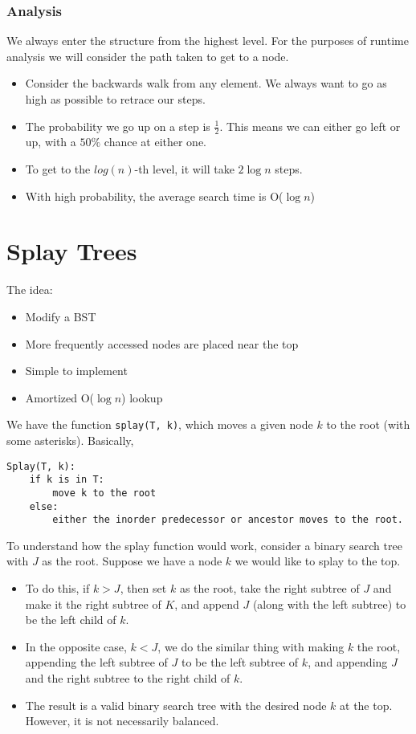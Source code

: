 \documentclass[10pt]{article}
\begin{document}
\subsubsection*{Analysis}
We always enter the structure from the highest level.  For the purposes of runtime analysis we will consider the path taken to get to a node.
\begin{itemize}
	\item Consider the backwards walk from any element.  We always want to go as high as possible to retrace our steps.
	\item The probability we go up on a step is $\frac{1}{2}$.  This means we can either go left or up, with a $50\%$ chance at either one.
	\item To get to the $log(n)$-th level, it will take $2\log n$ steps.
	\item With high probability, the average search time is O($\log n$)
\end{itemize}

\section*{Splay Trees}
The idea:
\begin{itemize}
	\item Modify a BST
	\item More frequently accessed nodes are placed near the top
	\item Simple to implement
	\item Amortized O($\log n$) lookup
\end{itemize}
We have the function \texttt{splay(T, k)}, which moves a given node $k$ to the root (with some asterisks).  Basically,
\begin{verbatim}
Splay(T, k):
    if k is in T:
        move k to the root
    else:
        either the inorder predecessor or ancestor moves to the root.
\end{verbatim}
To understand how the splay function would work, consider a binary search tree with $J$ as the root.  Suppose we have a node $k$ we would like to splay to the top.
\begin{itemize}
	\item To do this, if $k > J$, then set $k$ as the root, take the right subtree of $J$ and make it the right subtree of $K$, and append $J$ (along with the left subtree) to be the left child of $k$.
	\item In the opposite case, $k < J$, we do the similar thing with making $k$ the root, appending the left subtree of $J$ to be the left subtree of $k$, and appending $J$ and the right subtree to the right child of $k$.
	\item The result is a valid binary search tree with the desired node $k$ at the top.  However, it is not necessarily balanced.
\end{itemize}
\end{document}
